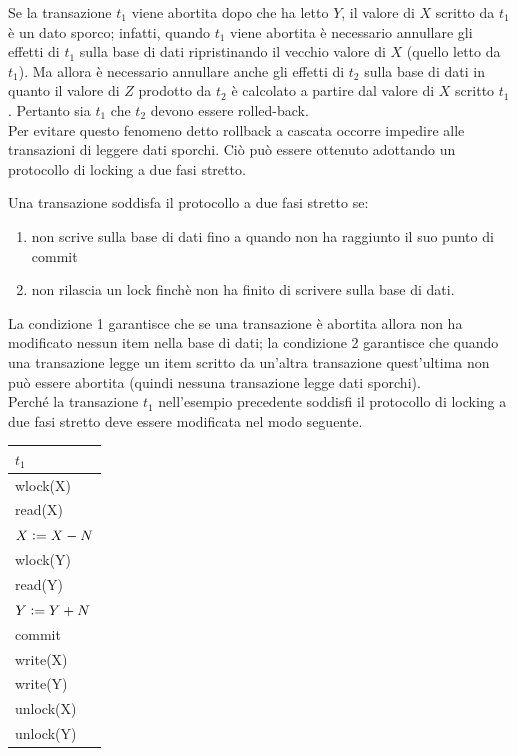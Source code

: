 Se la transazione $t_1$ viene abortita dopo che ha letto $Y$, il valore di $X$ scritto da $t_1$ è un dato
sporco; infatti, quando $t_1$ viene abortita è necessario annullare gli effetti di $t_1$ sulla base di dati
ripristinando il vecchio valore di $X$ (quello letto da $t_1$). Ma allora è necessario annullare anche gli
effetti di $t_2$ sulla base di dati in quanto il valore di $Z$ prodotto da $t_2$ è calcolato a partire dal valore
di $X$ scritto $t_1$. Pertanto sia $t_1$ che $t_2$ devono essere rolled-back.\\
Per evitare questo fenomeno detto rollback a cascata occorre impedire alle transazioni di leggere
dati sporchi. Ciò può essere ottenuto adottando un protocollo di locking a due fasi stretto.
\begin{defn}
 Una transazione soddisfa il protocollo a due fasi stretto se:
 \begin{enumerate}
  \item non scrive sulla base di dati fino a quando non ha raggiunto il suo punto di commit
  \item non rilascia un lock finchè non ha finito di scrivere sulla base di dati.
 \end{enumerate}
\end{defn}

La condizione 1 garantisce che se una transazione è abortita allora non ha modificato nessun item
nella base di dati; la condizione 2 garantisce che quando una transazione legge un item scritto da
un'altra transazione quest'ultima non può essere abortita (quindi nessuna transazione legge dati
sporchi).\\
Perché la transazione $t_1$ nell'esempio precedente soddisfi il protocollo di locking a due fasi stretto
deve essere modificata nel modo seguente.

\begin{center}
 \begin{tabular}{|l|}
  \hline
  $t_1$\\
  \hline
wlock(X)\\
read(X)\\
$X\vcentcolon=X-N$\\
wlock(Y)\\
read(Y)\\
$Y\vcentcolon=Y+N$\\
commit\\
write(X)\\
write(Y)\\
unlock(X)\\
unlock(Y)\\
\hline
 \end{tabular}
\end{center}

